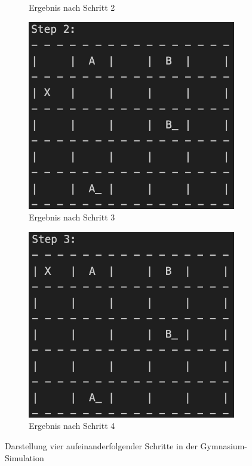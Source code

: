 \documentclass[11pt]{article}
\begin{document}
\begin{figure}[h]
\begin{subfigure}[b]{0.45\textwidth}
        \caption{Ergebnis nach Schritt 2}
    \end{subfigure}
    
    \vspace{1em} %
    
    \begin{subfigure}[b]{0.45\textwidth}
        \centering
        \includegraphics[width=\textwidth]{img/step_2.png}
        \caption{Ergebnis nach Schritt 3}
    \end{subfigure}
    \hfill %
    \begin{subfigure}[b]{0.45\textwidth}
        \centering
        \includegraphics[width=\textwidth]{img/step_3.png}
        \caption{Ergebnis nach Schritt 4}
    \end{subfigure}
    \caption{Darstellung vier aufeinanderfolgender Schritte in der Gymnasium-Simulation}
    \label{img:2_2}
\end{figure}
\end{document}
